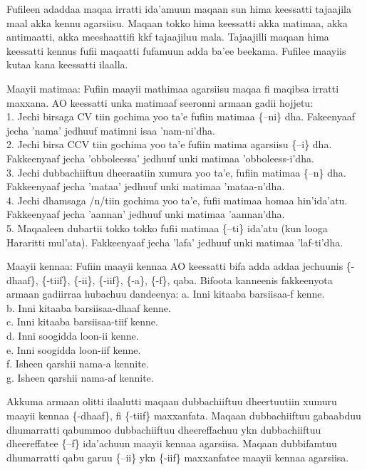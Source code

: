\documentclass[11pt,b5paper]{book}
\begin{document}
Fufileen adaddaa maqaa irratti ida'amuun maqaan sun hima keessatti tajaajila maal akka kennu agarsiisu. Maqaan tokko hima keessatti akka matimaa, akka antimaatti, akka meeshaattifi kkf tajaajiluu mala. Tajaajilli maqaan hima keessatti kennus fufii maqaatti fufamuun adda ba'ee beekama. Fufilee maayiis kutaa kana keessatti ilaalla.

Maayii matimaa: Fufiin maayii mathimaa agarsiisu maqaa fi maqibsa irratti maxxana. AO keessatti unka matimaaf seeronni armaan gadii hojjetu\cite{griefenow2001grammatical}: \\
1. Jechi birsaga CV tiin gochima yoo ta’e fufiin matimaa \{–ni\} dha. Fakeenyaaf jecha 'nama' jedhuuf matimni isaa 'nam-ni'dha.\\
2. Jechi birsa CCV tiin gochima yoo ta’e fufiin matima agarsiisu \{–i\} dha. Fakkeenyaaf jecha 'obboleessa' jedhuuf unki matimaa 'obboleess-i'dha.\\
3. Jechi dubbachiiftuu dheeraatiin xumura yoo ta’e, fufiin matimaa \{–n\} dha. Fakkeenyaaf jecha 'mataa' jedhuuf unki matimaa 'mataa-n'dha.\\
4. Jechi dhamsaga /n/tiin gochima yoo ta’e, fufii matimaa homaa hin’ida’atu. Fakkeenyaaf jecha 'aannan' jedhuuf unki matimaa 'aannan'dha.\\
5. Maqaaleen dubartii tokko tokko fufii matimaa \{–ti\} ida’atu (kun looga Hararitti mul’ata). Fakkeenyaaf jecha 'lafa' jedhuuf unki matimaa 'laf-ti'dha.

Maayii kennaa:  Fufiin maayii kennaa AO keessatti bifa adda addaa jechuunis \{-dhaaf\}, \{-tiif\}, \{-ii\}, \{-iif\}, \{-a\}, \{-f\}, qaba. Bifoota kanneenis
fakkeenyota armaan gadiirraa hubachuu dandeenya:
a. Inni kitaaba barsiisaa-f kenne.\\
b. Inni kitaaba barsiisaa-dhaaf kenne.\\
c. Inni kitaaba barsiisaa-tiif kenne.\\
d. Inni soogidda loon-ii kenne.\\
e. Inni soogidda loon-iif kenne.\\
f. Isheen qarshii nama-a kennite.\\
g. Isheen qarshii nama-af kennite.

Akkuma armaan olitti ilaalutti maqaan dubbachiiftuu dheertuutiin xumuru maayii kennaa \{-dhaaf\}, fi \{-tiif\} maxxanfata. Maqaan dubbachiiftuu gabaabduu dhumarratti qabummoo dubbachiiftuu dheereffachuu ykn dubbachiiftuu dheereffatee \{–f\} ida'achuun maayii kennaa agarsiisa. Maqaan dubbifamtuu dhumarratti qabu garuu \{–ii\} ykn \{-iif\} maxxanfatee maayii kennaa agarsiisa. 
\end{document}
